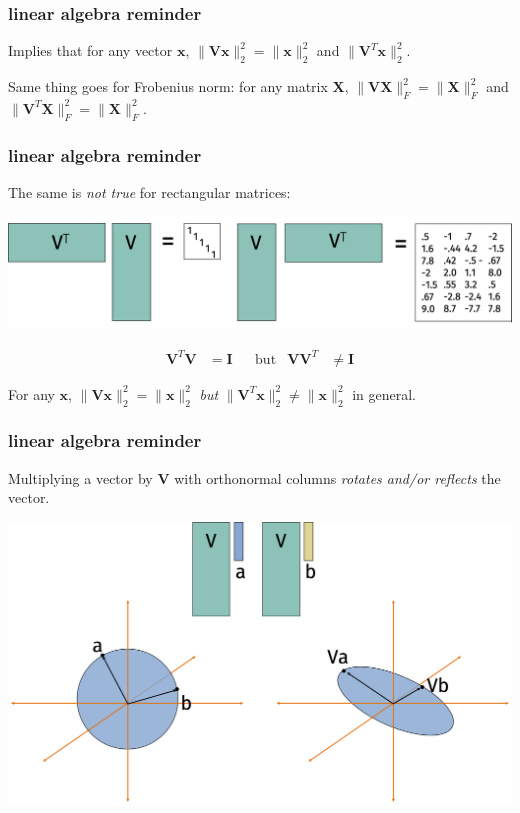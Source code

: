 \documentclass[compress]{beamer}
\newcommand{\bv}[1]{\mathbf{#1}}
\begin{document}
\begin{frame}[t]
	\frametitle{linear algebra reminder}
	Implies that for any vector $\bv{x}$, $\|\bv{V}\bv{x}\|_2^2 = \|\bv{x}\|_2^2$ and $\|\bv{V}^T \bv{x}\|_2^2$.
	
	\vspace{1em}
	
	Same thing goes for Frobenius norm: for any matrix $\bv{X}$, $\|\bv{V}\bv{X}\|_F^2 = \|\bv{X}\|_F^2$ and $\|\bv{V}^T \bv{X}\|_F^2 = \|\bv{X}\|_F^2$.
\end{frame}

\begin{frame}[t]
	\frametitle{linear algebra reminder}
	The same is \emph{not true} for rectangular matrices:
	\begin{center}
		\includegraphics[width=\textwidth]{orth_rect.png}
	\end{center}
	\begin{align*}
		\bv{V}^T\bv{V} &= \bv{I} & &\text{but} & \bv{V}\bv{V}^T & \neq \bv{I}
	\end{align*}

For any $\bv{x}$, $\|\bv{V}\bv{x}\|_2^2 =\|\bv{x}\|_2^2$ \emph{but} $\|\bv{V}^T\bv{x}\|_2^2 \neq \|\bv{x}\|_2^2$ in general.  


	
\end{frame}

\begin{frame}[t]
	\frametitle{linear algebra reminder}
	Multiplying a vector by $\bv{V}$ with orthonormal columns \emph{rotates and/or reflects} the vector. 
	\begin{center}
		\includegraphics[width=\textwidth]{rotation_new.png}
	\end{center}
\end{frame}
\end{document}
